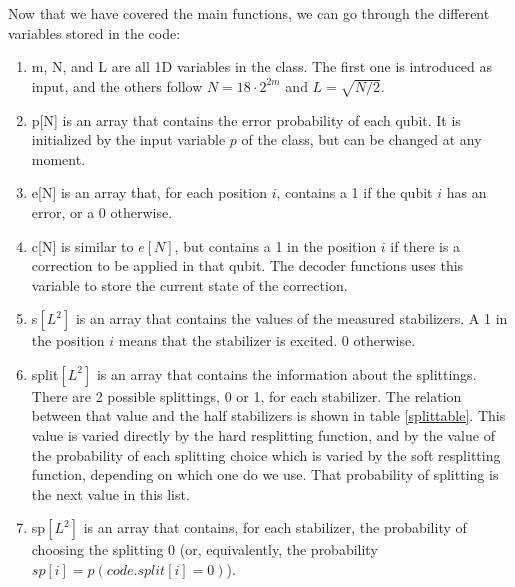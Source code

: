\documentclass[a4paper,12pt]{article}
\begin{document}
Now that we have covered the main functions, we can go through the different variables stored in the code:

\begin{enumerate}
\item m, N, and L are all 1D variables in the class. The first one is introduced as input, and the others follow $N=18\cdot 2^{2m}$ and $L=\sqrt{N/2}$.

\item p[N] is an array that contains the error probability of each qubit. It is initialized by the input variable $p$ of the class, but can be changed at any moment. 

\item e[N] is an array that, for each position $i$, contains a 1 if the qubit $i$ has an error, or a 0 otherwise.

\item c[N] is similar to $e[N]$, but contains a 1 in the position $i$ if there is a correction to be applied in that qubit. The decoder functions uses this variable to store the current state of the correction.

\item s$[L^2]$ is an array that contains the values of the measured stabilizers. A 1 in the position $i$ means that the stabilizer is excited. 0 otherwise. 

\item split$[L^2]$ is an array that contains the information about the splittings. There are 2 possible splittings, 0 or 1, for each stabilizer. The relation between that value and the half stabilizers is shown in  table \ref{splittable}. This value is varied directly by the hard resplitting function, and by the value of the probability of each splitting choice which is varied by the soft resplitting function, depending on which one do we use. That probability of splitting is the next value in this list.

\item sp$[L^2]$ is an array that contains, for each stabilizer, the probability of choosing the splitting 0 (or, equivalently, the probability $sp[i]=p(code.split[i]=0)$).


\end{enumerate}
\end{document}
